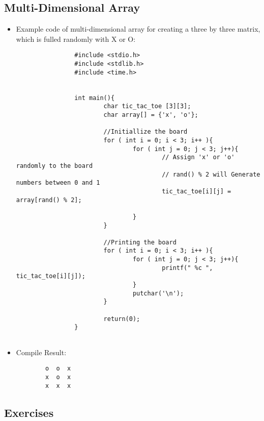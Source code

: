 \subsection{Multi-Dimensional Array}
\begin{itemize}
        \item Example code of multi-dimensional array for creating a three by three matrix, which is fulled randomly with X or O:
        \begin{lstlisting}
                #include <stdio.h>
                #include <stdlib.h>
                #include <time.h>
                
                
                int main(){
                        char tic_tac_toe [3][3];
                        char array[] = {'x', 'o'};
                
                        //Initiallize the board
                        for ( int i = 0; i < 3; i++ ){
                                for ( int j = 0; j < 3; j++){
                                        // Assign 'x' or 'o' randomly to the board
                                        // rand() % 2 will Generate numbers between 0 and 1
                                        tic_tac_toe[i][j] = array[rand() % 2];
                
                                }
                        }
                
                        //Printing the board
                        for ( int i = 0; i < 3; i++ ){
                                for ( int j = 0; j < 3; j++){
                                        printf(" %c ", tic_tac_toe[i][j]);
                                }
                                putchar('\n');
                        }
                
                        return(0);
                }
               

      \end{lstlisting}
      \item Compile Result:
      \begin{lstlisting}
        o  o  x
        x  o  x
        x  x  x
      \end{lstlisting}
      \end{itemize}
\subsection{Exercises}